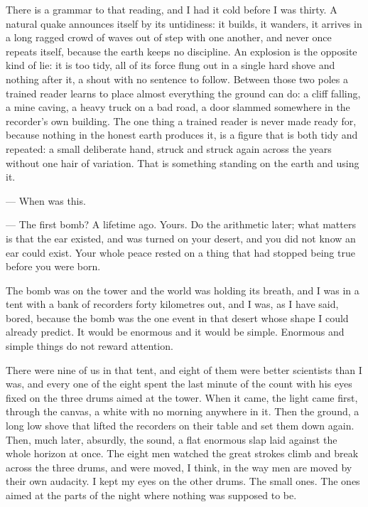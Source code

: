 There is a grammar to that reading, and I had it cold before I was thirty. A natural quake announces itself by its untidiness: it builds, it wanders, it arrives in a long ragged crowd of waves out of step with one another, and never once repeats itself, because the earth keeps no discipline. An explosion is the opposite kind of lie: it is too tidy, all of its force flung out in a single hard shove and nothing after it, a shout with no sentence to follow. Between those two poles a trained reader learns to place almost everything the ground can do: a cliff falling, a mine caving, a heavy truck on a bad road, a door slammed somewhere in the recorder's own building. The one thing a trained reader is never made ready for, because nothing in the honest earth produces it, is a figure that is both tidy and repeated: a small deliberate hand, struck and struck again across the years without one hair of variation. That is something standing on the earth and using it.\par

\begin{room}

--- When was this.

--- The first bomb? A lifetime ago. Yours. Do the arithmetic later; what matters is that the ear existed, and was turned on your desert, and you did not know an ear could exist. Your whole peace rested on a thing that had stopped being true before you were born.

\end{room}

The bomb was on the tower and the world was holding its breath, and I was in a tent with a bank of recorders forty kilometres out, and I was, as I have said, bored, because the bomb was the one event in that desert whose shape I could already predict. It would be enormous and it would be simple. Enormous and simple things do not reward attention.\par

There were nine of us in that tent, and eight of them were better scientists than I was, and every one of the eight spent the last minute of the count with his eyes fixed on the three drums aimed at the tower. When it came, the light came first, through the canvas, a white with no morning anywhere in it. Then the ground, a long low shove that lifted the recorders on their table and set them down again. Then, much later, absurdly, the sound, a flat enormous slap laid against the whole horizon at once. The eight men watched the great strokes climb and break across the three drums, and were moved, I think, in the way men are moved by their own audacity. I kept my eyes on the other drums. The small ones. The ones aimed at the parts of the night where nothing was supposed to be.\par

